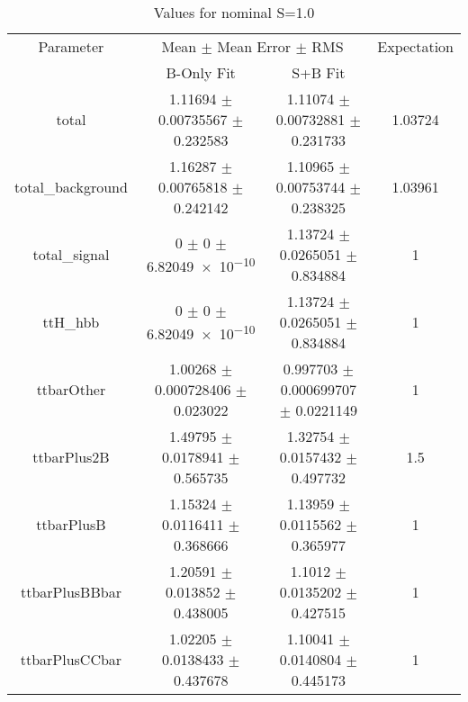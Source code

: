 \begin{table}
\centering
\caption{Values for nominal S=1.0}
\begin{tabular}{cccc}
\toprule
Parameter & \multicolumn{2}{c}{Mean $\pm$ Mean Error $\pm$ RMS} & Expectation\\
 & B-Only Fit & S+B Fit & \\
\midrule
total & \num{1.11694} $\pm$ \num{0.00735567} $\pm$ \num{0.232583} & \num{1.11074} $\pm$ \num{0.00732881} $\pm$ \num{0.231733} & \num{1.03724}\\
total\_background & \num{1.16287} $\pm$ \num{0.00765818} $\pm$ \num{0.242142} & \num{1.10965} $\pm$ \num{0.00753744} $\pm$ \num{0.238325} & \num{1.03961}\\
total\_signal & \num{0} $\pm$ \num{0} $\pm$ \num{6.82049e-10} & \num{1.13724} $\pm$ \num{0.0265051} $\pm$ \num{0.834884} & \num{1}\\
ttH\_hbb & \num{0} $\pm$ \num{0} $\pm$ \num{6.82049e-10} & \num{1.13724} $\pm$ \num{0.0265051} $\pm$ \num{0.834884} & \num{1}\\
ttbarOther & \num{1.00268} $\pm$ \num{0.000728406} $\pm$ \num{0.023022} & \num{0.997703} $\pm$ \num{0.000699707} $\pm$ \num{0.0221149} & \num{1}\\
ttbarPlus2B & \num{1.49795} $\pm$ \num{0.0178941} $\pm$ \num{0.565735} & \num{1.32754} $\pm$ \num{0.0157432} $\pm$ \num{0.497732} & \num{1.5}\\
ttbarPlusB & \num{1.15324} $\pm$ \num{0.0116411} $\pm$ \num{0.368666} & \num{1.13959} $\pm$ \num{0.0115562} $\pm$ \num{0.365977} & \num{1}\\
ttbarPlusBBbar & \num{1.20591} $\pm$ \num{0.013852} $\pm$ \num{0.438005} & \num{1.1012} $\pm$ \num{0.0135202} $\pm$ \num{0.427515} & \num{1}\\
ttbarPlusCCbar & \num{1.02205} $\pm$ \num{0.0138433} $\pm$ \num{0.437678} & \num{1.10041} $\pm$ \num{0.0140804} $\pm$ \num{0.445173} & \num{1}\\
\bottomrule
\end{tabular}
\end{table}